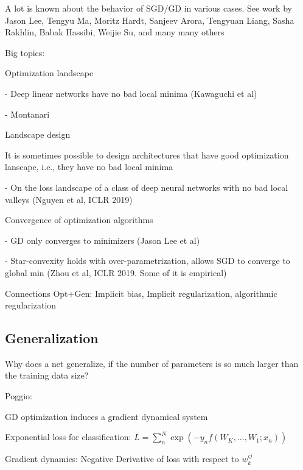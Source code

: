 \documentclass[english]{article}
\begin{document}
\item A lot is known about the behavior of SGD/GD in various cases. See work by Jason Lee, Tengyu Ma, Moritz Hardt, Sanjeev Arora, Tengyuan Liang, Sasha Rakhlin, Babak Hassibi, Weijie Su, and many many others

Big topics: 

\benum 
\item 
Optimization landscape

- Deep linear networks have no bad local minima (Kawaguchi et al)

- Montanari

\item Landscape design

It is sometimes possible to design architectures that have good optimization lanscape, i.e., they have no bad local minima

- On the loss landscape of a class of deep neural networks with no bad local valleys (Nguyen et al, ICLR 2019)


\item Convergence of optimization algorithms

- GD only converges to minimizers (Jason Lee et al)

- Star-convexity holds with over-parametrization, allows SGD to converge to global min (Zhou et al, ICLR 2019. Some of it is empirical) 


\item Connections Opt+Gen: Implicit bias, Implicit regularization, algorithmic regularization 

\eenum 

\eenum


\subsection{Generalization}


\benum
\item Why does a net generalize, if the number of parameters is so much larger than the training data size?

\item Poggio:

\benum
\item GD optimization induces a gradient dynamical system

\item Exponential loss for classification: $L  = \sum_n^N \exp(-y_n f(W_K,\ldots, W_1; x_n))$

Gradient dynamics: Negative Derivative of loss with respect to $w_k^{ij}$ 
\end{document}
